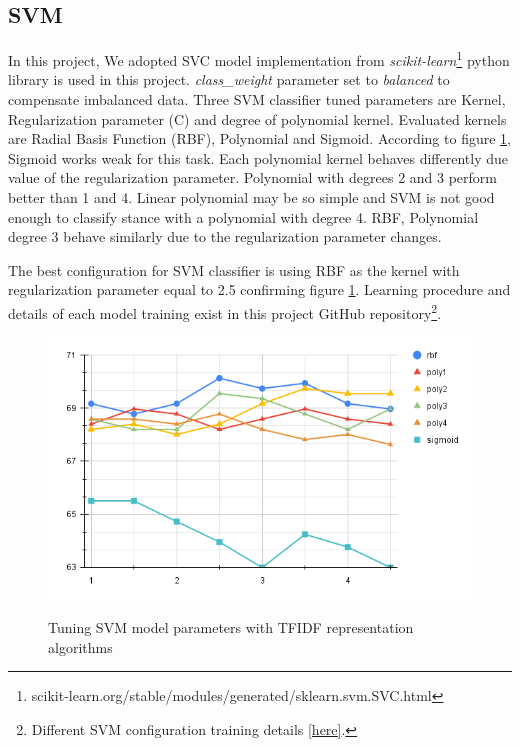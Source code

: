\subsection{SVM}
In this project, We adopted \ac{SVC} model implementation from \textit{scikit-learn}\footnote{scikit-learn.org/stable/modules/generated/sklearn.svm.SVC.html} python library is used in this project. \textit{class\_weight} parameter set to \textit{balanced} to compensate imbalanced data. Three \ac{SVM} classifier tuned parameters  are Kernel, Regularization parameter (C) and degree of polynomial kernel. Evaluated kernels are Radial Basis Function (\ac{RBF}), Polynomial and Sigmoid. According to figure \ref{fig:svm}, Sigmoid works weak for this task. Each polynomial kernel behaves differently due value of the regularization parameter. Polynomial with degrees 2 and 3 perform better than 1 and 4. Linear polynomial may be so simple and \ac{SVM} is not good enough to classify stance with a polynomial with degree 4. \ac{RBF}, Polynomial degree 3 behave similarly due to the regularization parameter changes. 

The best configuration for \ac{SVM} classifier is using \ac{RBF} as the kernel with regularization parameter equal to 2.5 confirming figure \ref{fig:svm}. Learning procedure and details of each model training exist in this project GitHub repository\footnote{Different SVM configuration training details \href{https://github.com/mahsaghn/stance\_detection/tree/main/selected\_outputs/machinelearning/svm}{[here]}.}.

\begin{figure}%
	\centering
	{\includegraphics[width=12.5cm]{statistics/svm.png} }
	\caption{Tuning \ac{SVM} model parameters with \ac{TFIDF} representation algorithms}%
	\label{fig:svm}%
\end{figure}

